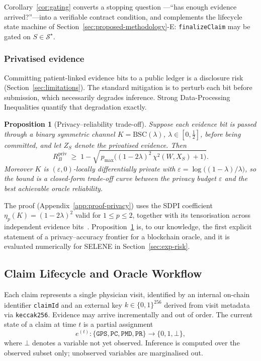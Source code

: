 \documentclass[journal]{IEEEtran}
\newtheorem{proposition}{Proposition}
\theoremstyle{definition}
\theoremstyle{remark}
\begin{document}
Corollary~\ref{cor:gating} converts a stopping question
---``has enough evidence arrived?''---into a verifiable
contract condition, and complements the lifecycle state
machine of Section~\ref{sec:proposed-methodology}-E:
\texttt{finalizeClaim} may be gated on
$S\in\mathcal{S}^\star$.

\subsubsection{Privatised evidence}

Committing patient-linked evidence bits to a public ledger
is a disclosure risk (Section~\ref{sec:limitations}). The
standard mitigation is to perturb each bit before
submission, which necessarily degrades inference. Strong
Data-Processing Inequalities quantify that degradation
exactly.

\begin{proposition}[Privacy--reliability trade-off]
\label{prop:privacy}
Suppose each evidence bit is passed through a binary
symmetric channel $K=\mathrm{BSC}(\lambda)$,
$\lambda\in[0,\tfrac12]$, before being committed, and let
$Z_S$ denote the privatised evidence. Then
\[
  R_B^{\mathrm{priv}}
  \;\geq\;
  1-\sqrt{\,p_{\max}\bigl(
     (1-2\lambda)^2\,\chi^2(W,X_S)+1\bigr)}.
\]
Moreover $K$ is $(\varepsilon,0)$-locally differentially
private with
$\varepsilon=\log\!\bigl((1-\lambda)/\lambda\bigr)$, so the
bound is a closed-form trade-off curve between the privacy
budget $\varepsilon$ and the best achievable oracle
reliability.
\end{proposition}

The proof (Appendix~\ref{app:proof-privacy}) uses the SDPI
coefficient $\eta_p(K)=(1-2\lambda)^2$ valid for
$1\le p\le 2$, together with its tensorisation across
independent evidence
bits~\cite{esposito2024lower}. Proposition~\ref{prop:privacy}
is, to our knowledge, the first explicit statement of a
privacy--accuracy frontier for a blockchain oracle, and it
is evaluated numerically for SELENE in
Section~\ref{sec:exp-risk}.

\subsection{Claim Lifecycle and Oracle Workflow}

Each claim represents a single physician visit,
identified by an internal on-chain identifier
\texttt{claimId} and an external key
$k\in\{0,1\}^{256}$ derived from visit metadata via
\texttt{keccak256}.
Evidence may arrive incrementally and out of order.
The current state of a claim at time $t$ is a partial
assignment
\[
  e^{(t)}:
  \{\texttt{GPS},\texttt{PC},\texttt{PMD},\texttt{PR}\}
  \rightarrow\{0,1,\bot\},
\]
where $\bot$ denotes a variable not yet observed.
Inference is computed over the observed subset only;
unobserved variables are marginalised out.
\end{document}
